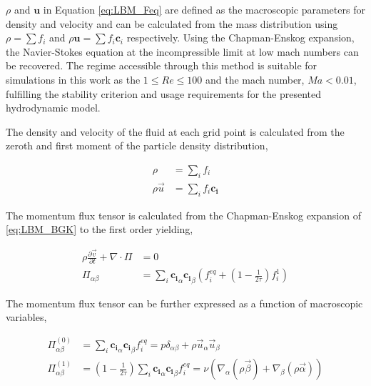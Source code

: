 $\rho$ and $\textbf{u}$ in Equation \ref{eq:LBM_Feq} are defined as the macroscopic parameters for density and velocity 
and can be calculated from the mass distribution using $\rho = \sum f_i$ and $\rho \mathbf{u} = \sum f_i \mathbf{c}_i$ 
respectively. Using the Chapman-Enskog expansion, the Navier-Stokes equation at the incompressible limit at low mach
numbers can be recovered. \cite{qian_lattice_1992, he_lattice_1997} The regime accessible through this method is suitable 
for simulations in this work as the $ 1 \leq Re \leq 100 $ and the mach number, $Ma < 0.01$, fulfilling the stability 
criterion and usage requirements for the presented hydrodynamic model.

The density and velocity of the fluid at each grid point is calculated from the zeroth and first moment of the particle density
distribution, 

\begin{equation}
    \begin{split}
        \rho &= \sum_i f_i \\
        \rho\vec{u} &= \sum_i f_i \mathbf{c_i}
    \end{split}
\end{equation}

The momentum flux tensor is calculated from the Chapman-Enskog expansion of \ref{eq:LBM_BGK} to the first order yielding,

\begin{equation}
    \begin{split}
        \rho\frac{\partial \vec{v}}{\partial t} + \nabla \cdot \Pi &= 0 \\
        \Pi_{\alpha \beta} &= \sum_i \mathbf{c_i}_\alpha \mathbf{c_i}_\beta (f_i^{eq} + (1 - \frac{1}{2 \tau})f_i^1)
    \end{split}
\end{equation}

The momentum flux tensor can be further expressed as a function of macroscopic variables, 

\begin{equation}
    \begin{split}
        \Pi^{(0)}_{\alpha \beta} &= \sum_i \mathbf{c_i}_\alpha \mathbf{c_i}_\beta f_i^{eq} = p \delta_{\alpha \beta} + \rho \vec{u}_\alpha \vec{u}_\beta \\
        \Pi^{(1)}_{\alpha \beta} &= (1 - \frac{1}{2 \tau})\sum_i \mathbf{c_i}_\alpha \mathbf{c_i}_\beta f_i^{eq} = \nu (\nabla_{\alpha}(\rho \vec{\beta}) + \nabla_{\beta}(\rho \vec{\alpha}))
    \end{split}
\end{equation}

